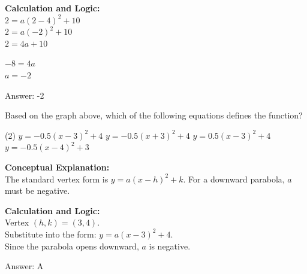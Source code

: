 \documentclass[11pt,paper=a4,answers]{exam}
\begin{document}
\begin{questions}
\begin{solution}
\vspace{20pt}

\textbf{Calculation and Logic:} \\
$2 = a(2-4)^2 + 10$ \\
$2 = a(-2)^2 + 10$ \\
$2 = 4a + 10$

\vspace{10pt}

$-8 = 4a$ \\
$a = -2$

\vspace{25pt}

Answer: \colorbox{yellow!100}{-2}
\end{solution}

\vspace{40pt}

\question
\begin{center}
\end{center}
Based on the graph above, which of the following equations defines the function?
\begin{tasks}(2)
    \task $y = -0.5(x-3)^2 + 4$
    \task $y = -0.5(x+3)^2 + 4$
    \task $y = 0.5(x-3)^2 + 4$
    \task $y = -0.5(x-4)^2 + 3$
\end{tasks}

\begin{solution}
\textbf{Conceptual Explanation:} \\
The standard vertex form is $y = a(x-h)^2 + k$. For a downward parabola, $a$ must be negative.

\vspace{20pt}

\textbf{Calculation and Logic:} \\
Vertex $(h, k) = (3, 4)$. \\
Substitute into the form: $y = a(x-3)^2 + 4$. \\
Since the parabola opens downward, $a$ is negative.

\vspace{25pt}

Answer: \colorbox{yellow!100}{A}
\end{solution}


\end{questions}
\end{document}

